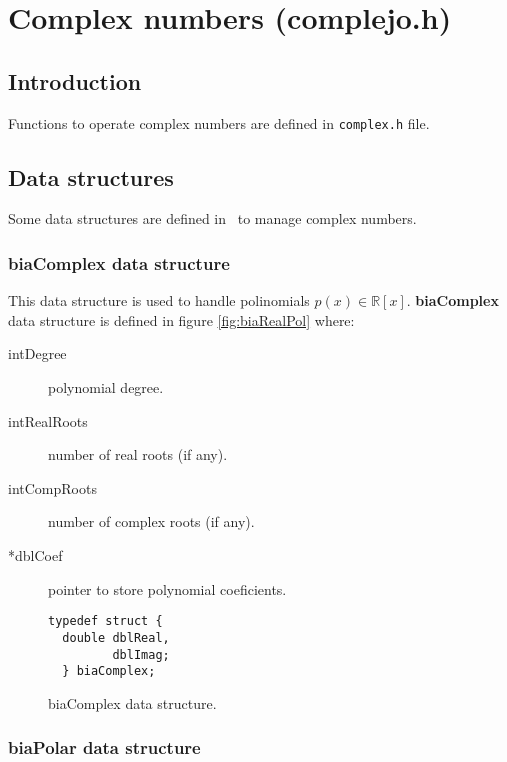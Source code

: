 %
%

\chapter{Complex numbers (complejo.h)}

\section{Introduction}

Functions to operate complex numbers are defined in \texttt{complex.h} file.\\

\section{Data structures}

Some data structures are defined in \BI \ to manage complex numbers.

\subsection{\textbf{biaComplex} data structure} \label{sec:biaComplex}

This data structure is used to handle polinomials $p(x) \in \mathbb{R}[x]$. \textbf{biaComplex} data structure is defined in figure \ref{fig:biaRealPol} where:

\begin{description}
\item[intDegree] polynomial degree.
\item[intRealRoots] number of real roots (if any).
\item[intCompRoots] number of complex roots (if any).
\item[*dblCoef] pointer to store polynomial coeficients.
\end{description}

\begin{figure}[!h]
\begin{verbatim}
typedef struct {
  double dblReal,
         dblImag;
  } biaComplex;
\end{verbatim}
\caption{biaComplex data structure.} \label{fig:biaComplex}
\end{figure}

\subsection{\textbf{biaPolar} data structure} \label{sec:biaPolar}

